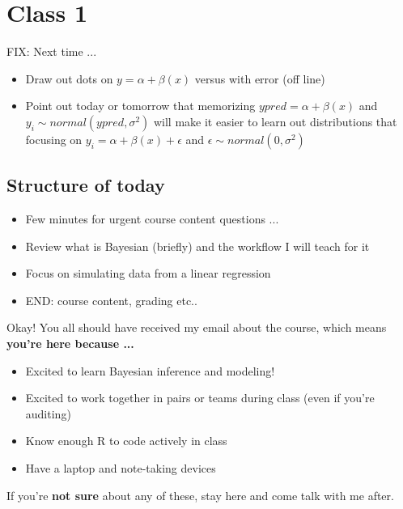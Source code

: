 \documentclass[11pt]{article}
\begin{document}

\renewcommand{\refname}{\CHead{}}

\tableofcontents


\newpage
\section{Class 1}  %

FIX: Next time ... 
\begin{itemize}
\item Draw out dots on $y=\alpha + \beta (x)$ versus with error (off line)
\item Point out today or tomorrow that memorizing $ypred=\alpha + \beta (x)$ and $y_i \sim normal(ypred, \sigma^2)$ will make it easier to learn out distributions that focusing on $y_i=\alpha + \beta (x) + \epsilon$ and $\epsilon \sim normal(0, \sigma^2)$ 
\end{itemize}

\subsection{Structure of today}
\begin{itemize}
\item Few minutes for urgent course content questions ... 
\item Review what is Bayesian (briefly) and the workflow I will teach for it
\item Focus on simulating data from a linear regression
\item END: course content, grading etc..
\end{itemize}
Okay! You all should have received my email about the course, which means\\ {\bf you're here because ... }
\begin{itemize}
\item Excited to learn Bayesian inference and modeling!
\item Excited to work together in pairs or teams during class (even if you're auditing)
\item Know enough R to code actively in class 
\item Have a laptop and note-taking devices
\end{itemize}
If you're {\bf not sure} about any of these, stay here and come talk with me after. 
\end{document}
